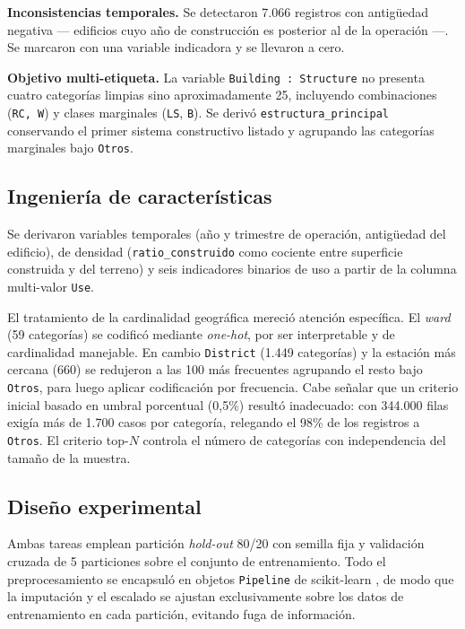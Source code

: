 \documentclass[conference]{IEEEtran}
\begin{document}
\textbf{Inconsistencias temporales.} Se detectaron 7.066 registros con antigüedad negativa
--- edificios cuyo año de construcción es posterior al de la operación ---. Se marcaron con
una variable indicadora y se llevaron a cero.

\textbf{Objetivo multi-etiqueta.} La variable \texttt{Building : Structure} no presenta cuatro
categorías limpias sino aproximadamente 25, incluyendo combinaciones (\texttt{RC, W}) y
clases marginales (\texttt{LS}, \texttt{B}). Se derivó \texttt{estructura\_principal}
conservando el primer sistema constructivo listado y agrupando las categorías marginales bajo
\texttt{Otros}.

\subsection{Ingeniería de características}

Se derivaron variables temporales (año y trimestre de operación, antigüedad del edificio), de
densidad (\texttt{ratio\_construido} como cociente entre superficie construida y del terreno) y
seis indicadores binarios de uso a partir de la columna multi-valor \texttt{Use}.

El tratamiento de la cardinalidad geográfica mereció atención específica. El \textit{ward}
(59 categorías) se codificó mediante \textit{one-hot}, por ser interpretable y de cardinalidad
manejable. En cambio \texttt{District} (1.449 categorías) y la estación más cercana (660) se
redujeron a las 100 más frecuentes agrupando el resto bajo \texttt{Otros}, para luego aplicar
codificación por frecuencia. Cabe señalar que un criterio inicial basado en umbral porcentual
(0,5\%) resultó inadecuado: con 344.000 filas exigía más de 1.700 casos por categoría,
relegando el 98\% de los registros a \texttt{Otros}. El criterio top-$N$ controla el número de
categorías con independencia del tamaño de la muestra.

\subsection{Diseño experimental}

Ambas tareas emplean partición \textit{hold-out} 80/20 con semilla fija y validación cruzada de
5 particiones sobre el conjunto de entrenamiento. Todo el preprocesamiento se encapsuló en
objetos \texttt{Pipeline} de scikit-learn \cite{pedregosa2011}, de modo que la imputación y el
escalado se ajustan exclusivamente sobre los datos de entrenamiento en cada partición,
evitando fuga de información.
\end{document}
